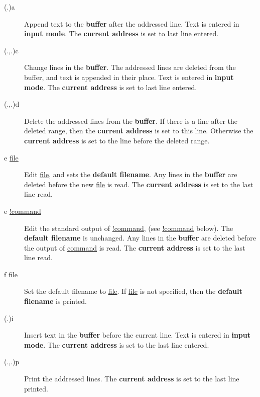 \documentclass[a4paper,10pt]{article}
\begin{document}
\begin{description}

    \item[(.)a] Append text to the \textbf{buffer} after the addressed line. Text is
            entered in \textbf{input mode}. The \textbf{current address} is set to last line entered.

    \item[(.,.)c] Change lines in the \textbf{buffer}. The addressed lines are deleted
            from the buffer, and text is appended in their place. Text is entered in
            \textbf{input mode}. The \textbf{current address} is set to last line entered.

    \item[(.,.)d] Delete the addressed lines from the \textbf{buffer}.  If there is a
            line after the deleted range, then the \textbf{current address} is
            set to this line.  Otherwise the \textbf{current address} is set to
            the line before the deleted range.

    \item[e \underline{file}] Edit \underline{file}, and sets the
            \textbf{default filename}. Any lines in the \textbf{buffer} are deleted before the
            new \underline{file} is read. The \textbf{current address} is set to the last line read.    

    \item[e \underline{!command}] Edit the standard output of \underline{!command}, (see \underline{!command} below).
             The \textbf{default filename} is unchanged.  Any lines in the \textbf{buffer}
             are deleted before the output of \underline{command} is read.  The
             \textbf{current address} is set to the last line read.
             
    \item[f \underline{file}] Set the default filename to \underline{file}.  If
            \underline{file} is not specified, then the \textbf{default filename} is
            printed.
    
    \item[(.)i] Insert text in the \textbf{buffer} before the current line.  Text is
            entered in \textbf{input mode}.  The \textbf{current address} is set to the last
            line entered.

    \item[(.,.)p] Print the addressed lines. The \textbf{current address} is set to the last
            line printed.


\end{description}
\end{document}
